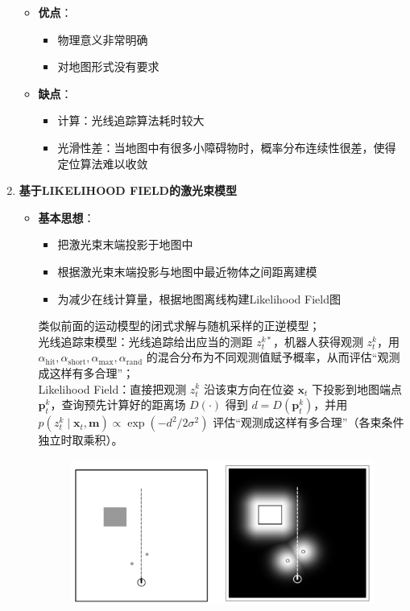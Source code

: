 \documentclass[../main.tex]{subfiles}
\begin{document}
\begin{enumerate}
\begin{itemize}
\begin{itemize}
            \end{itemize}
                \item \textbf{优点}：
                \begin{itemize}
                    \item 物理意义非常明确
                    \item 对地图形式没有要求
                \end{itemize}
                \item \textbf{缺点}：
                \begin{itemize}
                    \item 计算：光线追踪算法耗时较大
                    \item 光滑性差：当地图中有很多小障碍物时，概率分布连续性很差，使得定位算法难以收敛
                \end{itemize}                
            \end{itemize}
 \item \textbf{基于LIKELIHOOD FIELD的激光束模型}
 \begin{itemize}
     \item \textbf{基本思想}：
     \begin{itemize}
         \item 把激光束末端投影于地图中
         \item 根据激光束末端投影与地图中最近物体之间距离建模
         \item 为减少在线计算量，根据地图离线构建Likelihood Field图
     \end{itemize}
        {\small\kaishu
        类似前面的运动模型的闭式求解与随机采样的正逆模型；\\
        \vspace{1em}
        光线追踪束模型：光线追踪给出应当的测距 $z_{t}^{k*}$，机器人获得观测 $z_t^k$，用$\alpha_{\mathrm{hit}},\alpha_{\mathrm{short}},\alpha_{\mathrm{max}},\alpha_{\mathrm{rand}}$
        的混合分布为不同观测值赋予概率，从而评估“观测成这样有多合理”；\\
        \vspace{1em}
        Likelihood Field：直接把观测 $z_t^k$ 沿该束方向在位姿 $\mathbf{x}_t$ 下投影到地图端点
        $\mathbf{p}_{t}^{k}$，查询预先计算好的距离场 $D(\cdot)$ 得到
        $d=D(\mathbf{p}_{t}^{k})$，并用
        $p(z_t^k\mid\mathbf{x}_t,\mathbf{m})\propto\exp(-d^{2}/2\sigma^{2})$
        评估“观测成这样有多合理”（各束条件独立时取乘积）。}
    \begin{figure}[H]
        \centering
        \includegraphics[width=0.5\linewidth]{images/Likelyhood.png}

\end{figure}
\end{itemize}
\end{enumerate}
\end{document}
